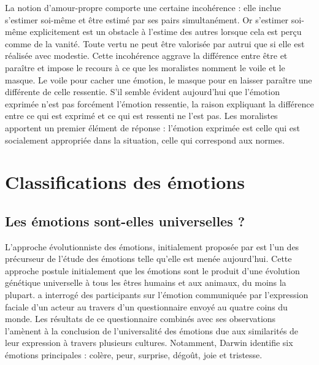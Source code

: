 \documentclass[a4paper,12pt]{report}
\begin{document}
La notion d'amour-propre comporte une certaine incohérence : elle inclue s'estimer soi-même et être estimé par ses pairs simultanément. Or s'estimer soi-même explicitement est un obstacle à l'estime des autres lorsque cela est perçu comme de la vanité. Toute vertu ne peut être valorisée par autrui que si elle est réalisée avec modestie. Cette incohérence aggrave la différence entre être et paraître et impose le recours à ce que les moralistes nomment le voile et le masque. Le voile pour cacher une émotion, le masque pour en laisser paraître une différente de celle ressentie. S'il semble évident aujourd'hui que l'émotion exprimée n'est pas forcément l'émotion ressentie, la raison expliquant la différence entre ce qui est exprimé et ce qui est ressenti ne l'est pas. Les moralistes apportent un premier élément de réponse : l'émotion exprimée est celle qui est socialement appropriée dans la situation, celle qui correspond aux normes.

\section{Classifications des émotions}
\subsection{Les émotions sont-elles universelles ?}
	
L'approche évolutionniste des émotions, initialement proposée par \textcite{darwin1872} est l'un des précurseur de l'étude des émotions telle qu'elle est menée aujourd'hui. Cette approche postule initialement que les émotions sont le produit d'une évolution génétique universelle à tous les êtres humains et aux animaux, du moins la plupart. \textcite{darwin1872} a interrogé des participants sur l'émotion communiquée par l'expression faciale d'un acteur au travers d'un questionnaire envoyé au quatre coins du monde. Les résultats de ce questionnaire combinés avec ses observations l'amènent à la conclusion de l'universalité des émotions due aux similarités de leur expression à travers plusieurs cultures. Notamment, Darwin identifie six émotions principales : colère, peur, surprise, dégoût, joie et tristesse. \par
\end{document}
